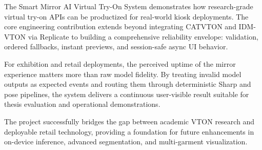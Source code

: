 The Smart Mirror AI Virtual Try-On System demonstrates how research-grade virtual try-on APIs can be productized for real-world kiosk deployments. The core engineering contribution extends beyond integrating CATVTON and IDM-VTON via Replicate to building a comprehensive reliability envelope: validation, ordered fallbacks, instant previews, and session-safe async UI behavior.

For exhibition and retail deployments, the perceived uptime of the mirror experience matters more than raw model fidelity. By treating invalid model outputs as expected events and routing them through deterministic Sharp and pose pipelines, the system delivers a continuous user-visible result suitable for thesis evaluation and operational demonstrations.

The project successfully bridges the gap between academic VTON research and deployable retail technology, providing a foundation for future enhancements in on-device inference, advanced segmentation, and multi-garment visualization.
